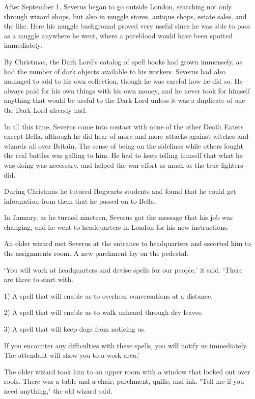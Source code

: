 \documentclass[a4paper,11pt]{article}
\begin{document}
After September 1, Severus began to go outside London, searching not only through wizard shops, but also in muggle stores, antique shops, estate sales, and the like. Here his muggle background proved very useful since he was able to pass as a muggle anywhere he went, where a pureblood would have been spotted immediately.

By Christmas, the Dark Lord's catalog of spell books had grown immensely, as had the number of dark objects available to his workers. Severus had also managed to add to his own collection, though he was careful how he did so. He always paid for his own things with his own money, and he never took for himself anything that would be useful to the Dark Lord unless it was a duplicate of one the Dark Lord already had.

In all this time, Severus came into contact with none of the other Death Eaters except Bella, although he did hear of more and more attacks against witches and wizards all over Britain. The sense of being on the sidelines while others fought the real battles was galling to him. He had to keep telling himself that what he was doing was necessary, and helped the war effort as much as the true fighters did.

During Christmas he tutored Hogwarts students and found that he could get information from them that he passed on to Bella.

In January, as he turned nineteen, Severus got the message that his job was changing, and he went to headquarters in London for his new instructions.

An older wizard met Severus at the entrance to headquarters and escorted him to the assignments room. A new parchment lay on the pedestal.

`You will work at headquarters and devise spells for our people,' it said. `There are three to start with.

1) A spell that will enable us to overhear conversations at a distance.

2) A spell that will enable us to walk unheard through dry leaves.

3) A spell that will keep dogs from noticing us.

If you encounter any difficulties with these spells, you will notify us immediately. The attendant will show you to a work area.'

The older wizard took him to an upper room with a window that looked out over roofs. There was a table and a chair, parchment, quills, and ink. "Tell me if you need anything," the old wizard said.
\end{document}
